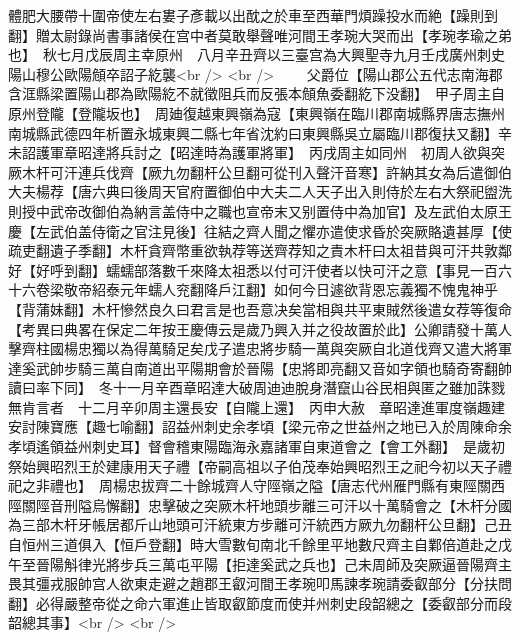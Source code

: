 體肥大腰帶十圍帝使左右婁子彥載以出酖之於車至西華門煩躁投水而絶【躁則到翻】贈太尉錄尚書事諸侯在宫中者莫敢舉聲唯河間王孝琬大哭而出【孝琬孝瑜之弟也】　秋七月戊辰周主幸原州　八月辛丑齊以三臺宫為大興聖寺九月壬戌廣州刺史陽山穆公歐陽頠卒詔子紇襲<br />
<br />
　　父爵位【陽山郡公五代志南海郡含洭縣梁置陽山郡為歐陽紇不就徵阻兵而反張本頠魚委翻紇下没翻】　甲子周主自原州登隴【登隴坂也】　周廸復越東興嶺為寇【東興嶺在臨川郡南城縣界唐志撫州南城縣武德四年析置永城東興二縣七年省沈約曰東興縣吳立屬臨川郡復扶又翻】辛未詔護軍章昭達將兵討之【昭達時為護軍將軍】　丙戌周主如同州　初周人欲與突厥木杆可汗連兵伐齊【厥九勿翻杆公旦翻可從刊入聲汗音寒】許納其女為后遣御伯大夫楊荐【唐六典曰後周天官府置御伯中大夫二人天子出入則侍於左右大祭祀盥洗則授中武帝改御伯為納言盖侍中之職也宣帝末又别置侍中為加官】及左武伯太原王慶【左武伯盖侍衛之官注見後】往結之齊人聞之懼亦遣使求昏於突厥賂遺甚厚【使疏吏翻遺子季翻】木杆貪齊幣重欲執荐等送齊荐知之責木杆曰太祖昔與可汗共敦鄰好【好呼到翻】蠕蠕部落數千來降太祖悉以付可汗使者以快可汗之意【事見一百六十六卷梁敬帝紹泰元年蠕人兖翻降戶江翻】如何今日遽欲背恩忘義獨不愧鬼神乎【背蒲妹翻】木杆慘然良久曰君言是也吾意决矣當相與共平東賊然後遣女荐等復命　【考異曰典畧在保定二年按王慶傳云是歲乃興入并之役故置於此】公卿請發十萬人擊齊柱國楊忠獨以為得萬騎足矣戊子遣忠將步騎一萬與突厥自北道伐齊又遣大將軍達奚武帥步騎三萬自南道出平陽期會於晉陽【忠將即亮翻又音如字領也騎奇寄翻帥讀曰率下同】　冬十一月辛酉章昭達大破周迪迪脫身潛竄山谷民相與匿之雖加誅戮無肯言者　十二月辛卯周主還長安【自隴上還】　丙申大赦　章昭達進軍度嶺趣建安討陳寶應【趣七喻翻】詔益州刺史余孝頃【梁元帝之世益州之地已入於周陳命余孝頃遙領益州刺史耳】督會稽東陽臨海永嘉諸軍自東道會之【會工外翻】　是歲初祭始興昭烈王於建康用天子禮【帝嗣高祖以子伯茂奉始興昭烈王之祀今初以天子禮祀之非禮也】　周楊忠拔齊二十餘城齊人守陘嶺之隘【唐志代州雁門縣有東陘關西陘關陘音刑隘烏懈翻】忠擊破之突厥木杆地頭步離三可汗以十萬騎會之【木杆分國為三部木杆牙帳居都斤山地頭可汗統東方步離可汗統西方厥九勿翻杆公旦翻】己丑自恒州三道俱入【恒戶登翻】時大雪數旬南北千餘里平地數尺齊主自鄴倍道赴之戊午至晉陽斛律光將步兵三萬屯平陽【拒達奚武之兵也】己未周師及突厥逼晉陽齊主畏其彊戎服帥宫人欲東走避之趙郡王叡河間王孝琬叩馬諫孝琬請委叡部分【分扶問翻】必得嚴整帝從之命六軍進止皆取叡節度而使并州刺史段韶總之【委叡部分而段韶總其事】<br />
<br />
